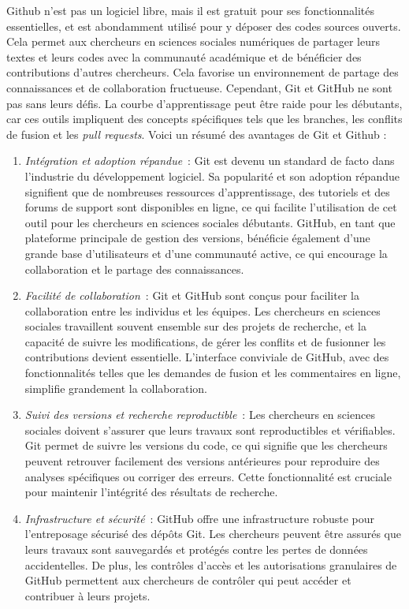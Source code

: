 \documentclass[
  letterpaper,
  DIV=11,
  numbers=noendperiod]{scrreprt}
\begin{document}
Github n'est pas un logiciel libre, mais il est gratuit pour ses
fonctionnalités essentielles, et est abondamment utilisé pour y déposer
des codes sources ouverts. Cela permet aux chercheurs en sciences
sociales numériques de partager leurs textes et leurs codes avec la
communauté académique et de bénéficier des contributions d'autres
chercheurs. Cela favorise un environnement de partage des connaissances
et de collaboration fructueuse. Cependant, Git et GitHub ne sont pas
sans leurs défis. La courbe d'apprentissage peut être raide pour les
débutants, car ces outils impliquent des concepts spécifiques tels que
les branches, les conflits de fusion et les \emph{pull requests}. Voici
un résumé des avantages de Git et Github :

\begin{enumerate}
\def\labelenumi{\arabic{enumi}.}
\item
  \emph{Intégration et adoption répandue}~: Git est devenu un standard
  de facto dans l'industrie du développement logiciel. Sa popularité et
  son adoption répandue signifient que de nombreuses ressources
  d'apprentissage, des tutoriels et des forums de support sont
  disponibles en ligne, ce qui facilite l'utilisation de cet outil pour
  les chercheurs en sciences sociales débutants. GitHub, en tant que
  plateforme principale de gestion des versions, bénéficie également
  d'une grande base d'utilisateurs et d'une communauté active, ce qui
  encourage la collaboration et le partage des connaissances.
\item
  \emph{Facilité de collaboration}~: Git et GitHub sont conçus pour
  faciliter la collaboration entre les individus et les équipes. Les
  chercheurs en sciences sociales travaillent souvent ensemble sur des
  projets de recherche, et la capacité de suivre les modifications, de
  gérer les conflits et de fusionner les contributions devient
  essentielle. L'interface conviviale de GitHub, avec des
  fonctionnalités telles que les demandes de fusion et les commentaires
  en ligne, simplifie grandement la collaboration.
\item
  \emph{Suivi des versions et recherche reproductible}~: Les chercheurs
  en sciences sociales doivent s'assurer que leurs travaux sont
  reproductibles et vérifiables. Git permet de suivre les versions du
  code, ce qui signifie que les chercheurs peuvent retrouver facilement
  des versions antérieures pour reproduire des analyses spécifiques ou
  corriger des erreurs. Cette fonctionnalité est cruciale pour maintenir
  l'intégrité des résultats de recherche.
\item
  \emph{Infrastructure et sécurité}~: GitHub offre une infrastructure
  robuste pour l'entreposage sécurisé des dépôts Git. Les chercheurs
  peuvent être assurés que leurs travaux sont sauvegardés et protégés
  contre les pertes de données accidentelles. De plus, les contrôles
  d'accès et les autorisations granulaires de GitHub permettent aux
  chercheurs de contrôler qui peut accéder et contribuer à leurs
  projets.
\end{enumerate}
\end{document}
